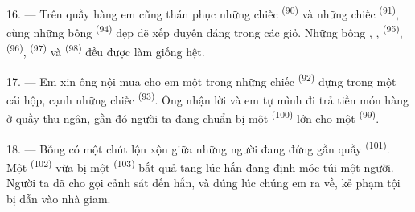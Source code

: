 16. --- Trên quầy hàng em cũng thán phục những chiếc 
\textsuperscript{(90)} và những chiếc  \textsuperscript{(91)},
cùng những bông  \textsuperscript{(94)} đẹp đẽ xếp duyên dáng trong các
giỏ. Những bông , , 
\textsuperscript{(95)},  \textsuperscript{(96)},  \textsuperscript{(97)} và  \textsuperscript{(98)} đều được làm
giống hệt.

\VUsaut{4.4mm}
\VUsaut{2.8mm}

17. --- Em xin ông nội mua cho em một trong những chiếc 
\textsuperscript{(92)} đựng trong một cái hộp, cạnh những chiếc 
\textsuperscript{(93)}. Ông nhận lời và em tự mình đi trả tiền món hàng ở quầy thu ngân,
gần đó người ta đang chuẩn bị một  \textsuperscript{(100)} lớn cho một
 \textsuperscript{(99)}.

18. --- Bỗng có một chút lộn xộn giữa những người đang đứng gần quầy  \textsuperscript{(101)}. Một  \textsuperscript{(102)} vừa bị một
 \textsuperscript{(103)} bắt quả tang lúc hắn đang định móc túi
một người. Người ta đã cho gọi cảnh sát đến  hắn, và đúng lúc chúng em ra
về, kẻ phạm tội bị dẫn vào nhà giam.
\VUsaut{6.0mm}
\VUfilet{22mm}
